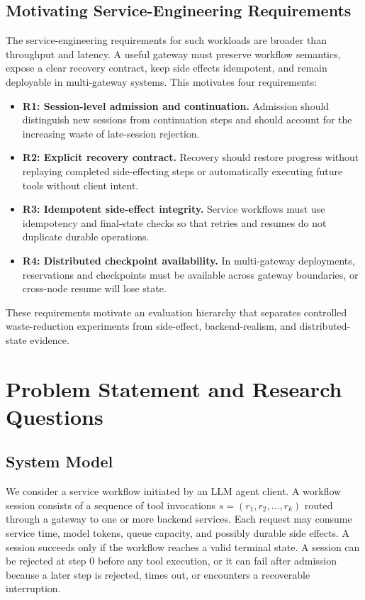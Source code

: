 \documentclass[5p,times]{elsarticle}
\begin{document}
\subsection{Motivating Service-Engineering Requirements}

The service-engineering requirements for such workloads are broader than throughput and latency. A useful gateway must preserve workflow semantics, expose a clear recovery contract, keep side effects idempotent, and remain deployable in multi-gateway systems. This motivates four requirements:

\begin{itemize}
  \item \textbf{R1: Session-level admission and continuation.} Admission should distinguish new sessions from continuation steps and should account for the increasing waste of late-session rejection.
  \item \textbf{R2: Explicit recovery contract.} Recovery should restore progress without replaying completed side-effecting steps or automatically executing future tools without client intent.
  \item \textbf{R3: Idempotent side-effect integrity.} Service workflows must use idempotency and final-state checks so that retries and resumes do not duplicate durable operations.
  \item \textbf{R4: Distributed checkpoint availability.} In multi-gateway deployments, reservations and checkpoints must be available across gateway boundaries, or cross-node resume will lose state.
\end{itemize}

These requirements motivate an evaluation hierarchy that separates controlled waste-reduction experiments from side-effect, backend-realism, and distributed-state evidence.

\section{Problem Statement and Research Questions}
\label{sec:problem}

\subsection{System Model}

We consider a service workflow initiated by an LLM agent client. A workflow session consists of a sequence of tool invocations $s = (r_1, r_2, \ldots, r_k)$ routed through a gateway to one or more backend services. Each request may consume service time, model tokens, queue capacity, and possibly durable side effects. A session succeeds only if the workflow reaches a valid terminal state. A session can be rejected at step 0 before any tool execution, or it can fail after admission because a later step is rejected, times out, or encounters a recoverable interruption.
\end{document}
